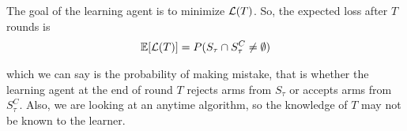 The goal of the learning agent is to minimize $\mathcal{L} (T)$. So, the expected loss after $T$ rounds is 
\begin{align*}
\mathbb{E}[\mathcal{L}(T)] = P(S_{\tau}\cap S_{\tau}^{C} \neq \emptyset)
\end{align*}

which we can say is the probability of making mistake, that is whether the learning agent at the end of round $T$ rejects arms from $S_{\tau}$ or accepts arms from $S_{\tau}^{C}$. Also, we are looking at an anytime algorithm, so the knowledge of $T$ may not be known to the learner.
